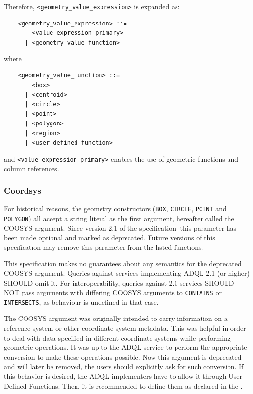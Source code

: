 \documentclass[11pt,a4paper]{ivoa}
\begin{document}
Therefore, \verb:<geometry_value_expression>: is expanded as:
\begin{verbatim}
    <geometry_value_expression> ::= 
        <value_expression_primary>
      | <geometry_value_function>
\end{verbatim}
\noindent
where
\begin{verbatim}
    <geometry_value_function> ::=
        <box>
      | <centroid>
      | <circle>
      | <point>
      | <polygon>
      | <region>
      | <user_defined_function>
\end{verbatim}
and \verb:<value_expression_primary>: enables the use of geometric functions
and column references.

\subsubsection{Coordsys}
\label{sec:geom.coordsys.param}

For historical reasons, the geometry constructors (\verb:BOX:, \verb:CIRCLE:,
\verb:POINT: and \verb:POLYGON:) all accept a string literal as the first
argument, hereafter called the COOSYS argument. Since version 2.1 of the
specification, this parameter has been made optional and marked as deprecated.
Future versions of this specification may remove this parameter from the listed
functions.

This specification makes no guarantees about any semantics for the deprecated
COOSYS argument. Queries against services implementing ADQL 2.1 (or higher)
SHOULD omit it. For interoperability, queries against 2.0 services SHOULD NOT
pass arguments with differing COOSYS arguments to \verb:CONTAINS: or
\verb:INTERSECTS:, as behaviour is undefined in that case.

The COOSYS argument was originally intended to carry information on
a reference system or other coordinate system metadata. This was helpful in
order to deal with data specified in different coordinate systems while
performing geometric operations. It was up to the ADQL service to perform
the appropriate conversion to make these operations possible. Now this argument
is deprecated and will later be removed, the users should explicitly ask for
such conversion. If this behavior is desired, the ADQL implementers have to
allow it through User Defined Functions. Then, it is recommended to define them
as declared in the \CatalogueUDF{}.
\end{document}
